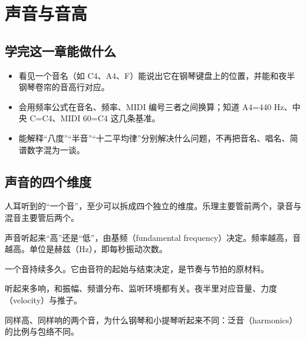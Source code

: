 \chapter{声音与音高}


\label{sec:sound-and-pitch}

\section*{学完这一章能做什么}
\begin{itemize}
  \item 看见一个音名（如 C4、A4、F）能说出它在钢琴键盘上的位置，并能和夜半钢琴卷帘的音高行对应。
  \item 会用频率公式在音名、频率、MIDI 编号三者之间换算；知道 A4=440 Hz、中央 C=C4、MIDI 60=C4 这几条基准。
  \item 能解释“八度”“半音”“十二平均律”分别解决什么问题，不再把音名、唱名、简谱数字混为一谈。
\end{itemize}

\section{声音的四个维度}

人耳听到的“一个音”，至少可以拆成四个独立的维度。乐理主要管前两个，录音与混音主要管后两个。

\begin{description}[leftmargin=2.2em,style=nextline]
  \item[音高（pitch）] 声音听起来“高”还是“低”，由基频（fundamental frequency）决定。频率越高，音越高。单位是赫兹（Hz），即每秒振动次数。
  \item[时值（duration）] 一个音持续多久。它由音符的起始与结束决定，是节奏与节拍的原材料。
  \item[响度（loudness）] 听起来多响，和振幅、频谱分布、监听环境都有关。夜半里对应音量、力度（velocity）与推子。
  \item[音色（timbre）] 同样高、同样响的两个音，为什么钢琴和小提琴听起来不同：泛音（harmonics）的比例与包络不同。
\end{description}

